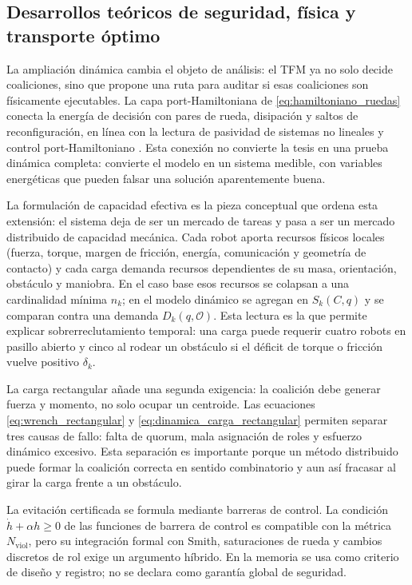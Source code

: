 \subsection{Desarrollos teóricos de seguridad, física y transporte óptimo}
\label{subsec:fronteras_teoricas_dinamicas}

La ampliación dinámica cambia el objeto de análisis: el TFM ya no solo decide
coaliciones, sino que propone una ruta para auditar si esas coaliciones son físicamente
ejecutables. La capa port-Hamiltoniana de \eqref{eq:hamiltoniano_ruedas} conecta la
energía de decisión con pares de rueda, disipación y saltos de reconfiguración, en línea
con la lectura de pasividad de sistemas no lineales \citep{vanderschraft2017l2gain} y
control port-Hamiltoniano \citep{ortega2002interconnection}. Esta conexión no convierte
la tesis en una prueba dinámica completa: convierte el modelo en un sistema medible, con
variables energéticas que pueden falsar una solución aparentemente buena.

La formulación de capacidad efectiva es la pieza conceptual que ordena esta extensión:
el sistema deja de ser un mercado de tareas y pasa a ser un mercado distribuido de
capacidad mecánica. Cada robot aporta recursos físicos locales (fuerza, torque, margen
de fricción, energía, comunicación y geometría de contacto) y cada carga demanda recursos
dependientes de su masa, orientación, obstáculo y maniobra. En el caso base esos recursos
se colapsan a una cardinalidad mínima $n_k$; en el modelo dinámico se agregan en
$S_k(C,q)$ y se comparan contra una demanda $D_k(q,\mathcal{O})$. Esta lectura es la que
permite explicar sobrerreclutamiento temporal: una carga puede requerir cuatro robots en
pasillo abierto y cinco al rodear un obstáculo si el déficit de torque o fricción vuelve
positivo $\delta_k$.

La carga rectangular añade una segunda exigencia: la coalición debe generar fuerza y
momento, no solo ocupar un centroide. Las ecuaciones \eqref{eq:wrench_rectangular} y
\eqref{eq:dinamica_carga_rectangular} permiten separar tres causas de fallo: falta de
quorum, mala asignación de roles y esfuerzo dinámico excesivo. Esta separación es
importante porque un método distribuido puede formar la coalición correcta en sentido
combinatorio y aun así fracasar al girar la carga frente a un obstáculo.

La evitación certificada se formula mediante barreras de control. La condición
$\dot h+\alpha h\geq0$ de las funciones de barrera de control
\citep{ames2017cbf} es compatible con la métrica $N_{\mathrm{viol}}$, pero su
integración formal con Smith, saturaciones de rueda y cambios discretos de rol exige un
argumento híbrido. En la memoria se usa como criterio de diseño y registro; no se
declara como garantía global de seguridad.

